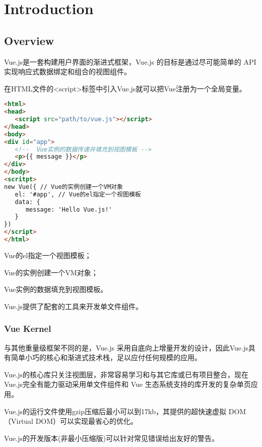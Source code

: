 \part{Introduction}


\chapter{Overview}

Vue.js是一套构建用户界面的渐进式框架，Vue.js 的目标是通过尽可能简单的 API 实现响应式数据绑定和组合的视图组件。

在HTML文件的<script>标签中引入Vue.js就可以把Vue注册为一个全局变量。



\begin{lstlisting}[language=HTML]
<html>
<head>
   <script src="path/to/vue.js"></script>
</head>
<body>
<div id="app">
   <!--  Vue实例的数据传递并填充到视图模板 -->
   <p>{{ message }}</p>
</div>
</body>
<scritpt>
new Vue({ // Vue的实例创建一个VM对象
   el: '#app', // Vue的el指定一个视图模板
   data: {
      message: 'Hello Vue.js!'
   }
})
</script>
</html>
\end{lstlisting}



\begin{compactitem}
\item Vue的el指定一个视图模板；
\item Vue的实例创建一个VM对象；
\item Vue实例的数据填充到视图模板。
\end{compactitem}

Vue.js提供了配套的工具来开发单文件组件。



\section{Vue Kernel}

与其他重量级框架不同的是，Vue.js 采用自底向上增量开发的设计，因此Vue.js具有简单小巧的核心和渐进式技术栈，足以应付任何规模的应用。

Vue.js的核心库只关注视图层，非常容易学习和与其它库或已有项目整合，现在Vue.js完全有能力驱动采用单文件组件和 Vue 生态系统支持的库开发的复杂单页应用。

Vue.js的运行文件使用gzip压缩后最小可以到17kb，其提供的超快速虚拟 DOM（Virtual DOM）可以实现最省心的优化。

Vue.js的开发版本(非最小压缩版)可以针对常见错误给出友好的警告。







